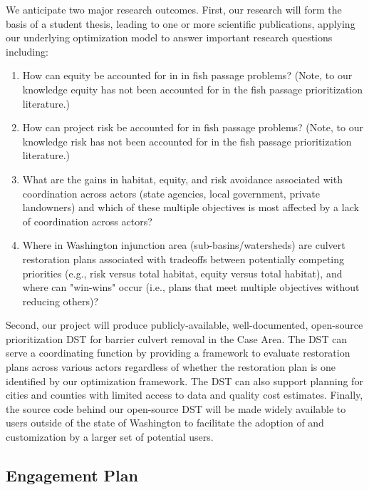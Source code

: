 \documentclass[12pt]{elsarticle}
\begin{document}
	We anticipate two major research outcomes. First, our research will form the basis of a student thesis, leading to one or more scientific publications, applying our underlying optimization model to answer important research questions including:
	
	\begin{enumerate}
		\item How can equity be accounted for in in fish passage problems? (Note, to our knowledge equity has not been accounted for in the fish passage prioritization literature.)
		\item How can project risk be accounted for in fish passage problems? (Note, to our knowledge risk has not been accounted for in the fish passage prioritization literature.)
		\item What are the gains in habitat, equity, and risk avoidance associated with coordination across actors (state agencies, local government, private landowners) and which of these multiple objectives is most affected by a lack of coordination across actors?
		\item Where in Washington injunction area (sub-basins/watersheds) are culvert restoration plans associated with tradeoffs between potentially competing priorities (e.g., risk versus total habitat, equity versus total habitat), and where can "win-wins" occur (i.e., plans that meet multiple objectives without reducing others)?
	\end{enumerate}
	
	
	Second, our project will produce publicly-available, well-documented, open-source prioritization DST for barrier culvert removal in the Case Area. The DST can serve a coordinating function by providing a framework to evaluate restoration plans across various actors regardless of whether the restoration plan is one identified by our optimization framework. The DST can also support planning for cities and counties with limited access to data and quality cost estimates. Finally, the source code behind our open-source DST will be made widely available to users outside of the state of Washington to facilitate the adoption of and customization by a larger set of potential users. 
	
	\subsection{Engagement Plan}\label{sec:engage}
	
\end{document}
